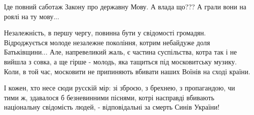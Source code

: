 Іде повний саботаж Закону про державну Мову. А влада що??? А грали вони на
роялі на ту мову...

Незалежність, в першу чергу, повинна бути у свідомості громадян. Відроджується
молоде незалежне покоління, котрим небайдуже доля Батьківщини... Але,
напревеликий жаль, є частина суспільства, котра так і не вийшла з совка, а ще
гірше - молодь, яка тащиться під московитську музику. Коли, в той час,
московити не припиняють вбивати наших Воїнів на сході країни.

І кожен, хто несе сюди русскій мір: зі зброєю, з брехнею, з пропагандою, чи
тими ж, здавалося б безневинними піснями, котрі насправді вбивають національну
свідомість людей, - відповідальні за смерть Синів України!


